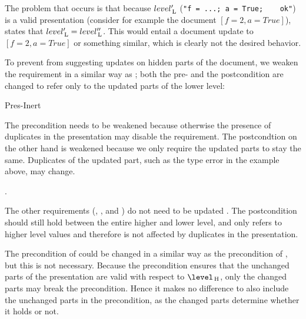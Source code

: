 The problem that occurs is that because $level'_{\, \mathrm L}$ (\verb|"f = ...; a = True;    ok"|) is a valid presentation (consider for example the document  $[f = 2, a = True]$),  states that $level'_{\, \mathrm L} = level''_{\, \mathrm L}$. This would entail a document update to 
$[f = 2, a = True]$ or something similar, which is clearly not the desired behavior.


%
%

To prevent  from suggesting updates on hidden parts of the document, we weaken the requirement in a similar way as ; both the pre- and the postcondition are changed to refer only to the updated parts of the lower level:


		{Pres-Inert}

The precondition needs to be weakened because otherwise the presence of duplicates in the presentation may disable the requirement. The postcondtion on the other hand is weakened because we only require the updated parts to stay the same. Duplicates of the updated part, such as the type error in the example above, may change.

.

The other requirements (, , and ) do not need to be updated . The postcondition should still hold between the entire higher and lower level, and  only refers to higher level values and therefore is not affected by duplicates in the presentation.

The precondition of  could be changed in a similar way as the precondition of , but this is not necessary. Because the precondition ensures that the unchanged parts of the presentation are valid with respect to $\level\H$, only the changed parts may break the precondition. Hence it makes no difference to also include the unchanged parts in the precondition, as the changed parts determine whether it holds or not.

